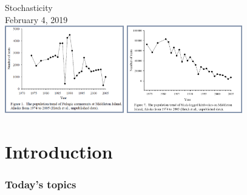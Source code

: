 \documentclass[color=usenames,dvipsnames]{beamer}\usepackage[]{graphicx}\usepackage[]{color}
\begin{document}
\begin{frame}[plain]
  \begin{center}
    {\Huge Stochasticity} \\
    { February 4, 2019} \\
    \vfill
    \includegraphics[height=3.8cm,keepaspectratio]{figs/pelagic-cormorants} \hspace{0.1cm}
    \includegraphics[height=3.8cm,keepaspectratio]{figs/kittiwakes} %
  \end{center}
\end{frame}




\section{Introduction}


\begin{frame}[plain]
  \frametitle{Today's topics}
  \tableofcontents%
\end{frame}
\end{document}

